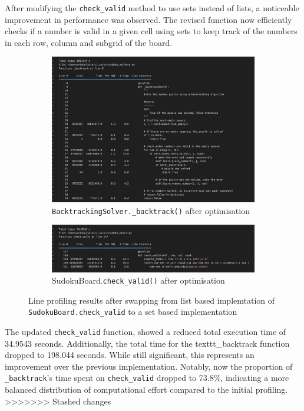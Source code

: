 \documentclass[11pt]{article}
\begin{document}
\begin{itemize}
After modifying the \texttt{check\_valid} method to use sets instead of lists, a noticeable improvement in performance was observed. The revised function now efficiently checks if a number is valid in a given cell using sets to keep track of the numbers in each row, column and subgrid of the board. 

\begin{figure}[H]
    \centering
    \begin{subfigure}[b]{0.8\textwidth}
        \includegraphics[width=\textwidth]{figs/bt_line_profile_after.png}
        \caption{\texttt{BacktrackingSolver.\_backtrack()} after optimisation}
        \label{fig:backtrack_after}
    \end{subfigure}
    \begin{subfigure}[b]{0.8\textwidth}
        \includegraphics[width=\textwidth]{figs/check_valid_after.png}
        \caption{SudokuBoard.\texttt{check\_valid()} after optimisation}
        \label{fig:check_valid_after}
    \end{subfigure}
    \caption{Line profiling results after swapping from list based implemtation of \texttt{SudokuBoard.check\_valid} to a set based implementation}
    \label{fig:line_profiling_after}
\end{figure}
The updated \texttt{check\_valid} function, showed a reduced total execution time of 34.9543 seconds. Additionally, the total time for the texttt{\_backtrack} function dropped to 198.044 seconds. While still significant, this represents an improvement over the previous implementation. Notably, now the proportion of \texttt{\_backtrack}'s time  spent on \texttt{check\_valid} dropped to 73.8\%, indicating a more balanced distribution of computational effort compared to the initial profiling.
>>>>>>> Stashed changes


\end{itemize}
\end{document}
